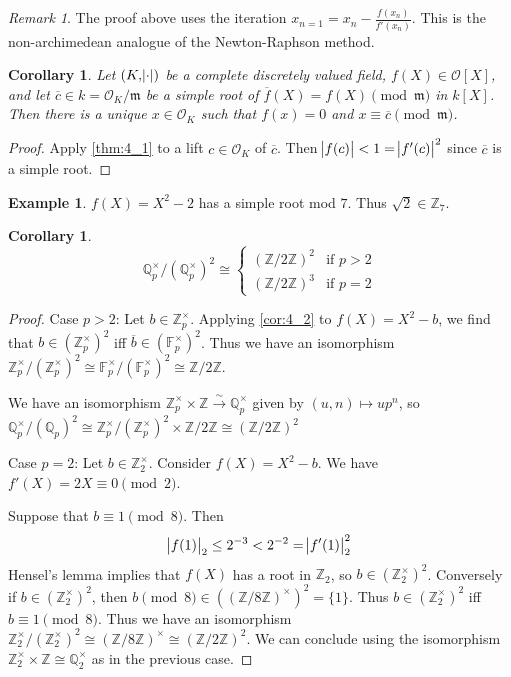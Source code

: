 \documentclass[11pt]{article}
\theoremstyle{definition}
\newtheorem*{example}{Example}
\theoremstyle{plain}
\newtheorem{corollary}[definition]{Corollary}
\theoremstyle{remark}
\newtheorem*{remark}{Remark}
\newcommand{\bF}{\mathbb{F}}
\newcommand{\bZ}{\mathbb{Z}}
\newcommand{\bQ}{\mathbb{Q}}
\newcommand{\cO}{\mathcal{O}}
\newcommand{\fm}{\mathfrak{m}}
\begin{document}
\begin{remark}
    The proof above uses the iteration $x_{n=1} = x_n - \frac{f(x_n)}{f'(x_n)}$. This is the non-archimedean analogue of the Newton-Raphson method.
\end{remark}

\begin{corollary}\label{cor:4_2}
    Let $(K, \abs{\cdot})$ be a complete discretely valued field, $f(X) \in \cO[X]$, and let $\overline{c} \in k = \cO_K / \fm$ be a simple root of $\overline{f}(X) = f(X) \pmod{\fm}$ in $k[X]$. Then there is a unique $x \in \cO_K$ such that $f(x) = 0$ and $x \equiv \overline{c} \pmod{\fm}$.
\end{corollary}
\begin{proof}
    Apply \autoref{thm:4_1} to a lift $c \in \cO_K$ of $\overline{c}$. Then $\abs{f(c)} < 1 = \abs{f'(c)}^2$ since $\overline{c}$ is a simple root.
\end{proof}

\begin{example}
    $f(X) = X^2 - 2$ has a simple root mod $7$. Thus $\sqrt{2} \in \bZ_7$.
\end{example}

\begin{corollary}\label{cor:4_3}
    \begin{equation*}
        \bQ_p^\times / (\bQ_p^\times)^2 \cong
        \begin{cases}
            (\bZ / 2 \bZ)^2 & \text{if } p > 2\\
            (\bZ / 2 \bZ)^3 & \text{if } p = 2
        \end{cases}
    \end{equation*}
\end{corollary}
\begin{proof}
    Case $p > 2$: Let $b \in \bZ_p^\times$. Applying \autoref{cor:4_2} to $f(X) = X^2 - b$, we find that $b \in (\bZ_p^\times)^2$ iff $\overline{b} \in (\bF_p^\times)^2$. Thus we have an isomorphism $\bZ_p^\times / (\bZ_p^\times)^2 \cong \bF_p^\times / (\bF_p^\times)^2 \cong \bZ / 2\bZ$.

    We have an isomorphism $\bZ_p^\times \times \bZ \xrightarrow{\sim} \bQ_p^\times$ given by $(u, n) \mapsto u p^n$, so $\bQ_p^\times / (\bQ_p)^2 \cong \bZ_p^\times / (\bZ_p^\times)^2 \times \bZ / 2\bZ \cong (\bZ / 2\bZ)^2$

    Case $p = 2$: Let $b \in \bZ_2^\times$. Consider $f(X) = X^2 - b$. We have $f'(X) = 2X \equiv 0 \pmod{2}$.

    Suppose that $b \equiv 1 \pmod{8}$. Then
    \begin{equation*}
        \abs{f(1)}_2 \le 2^{-3} < 2^{-2} = \abs{f'(1)}_2^2
    \end{equation*}
    Hensel's lemma implies that $f(X)$ has a root in $\bZ_2$, so $b \in (\bZ_2^\times)^2$. Conversely if $b \in (\bZ_2^\times)^2$, then $b \pmod{8} \in ((\bZ / 8\bZ)^\times)^2 = \{1\}$. Thus $b \in (\bZ_2^\times)^2$ iff $b \equiv 1 \pmod{8}$. Thus we have an isomorphism $\bZ_2^\times / (\bZ_2^\times)^2 \cong (\bZ / 8 \bZ)^\times \cong (\bZ / 2\bZ)^2$. We can conclude using the isomorphism $\bZ_2^\times \times \bZ \cong \bQ_2^\times$ as in the previous case.
\end{proof}
\end{document}
